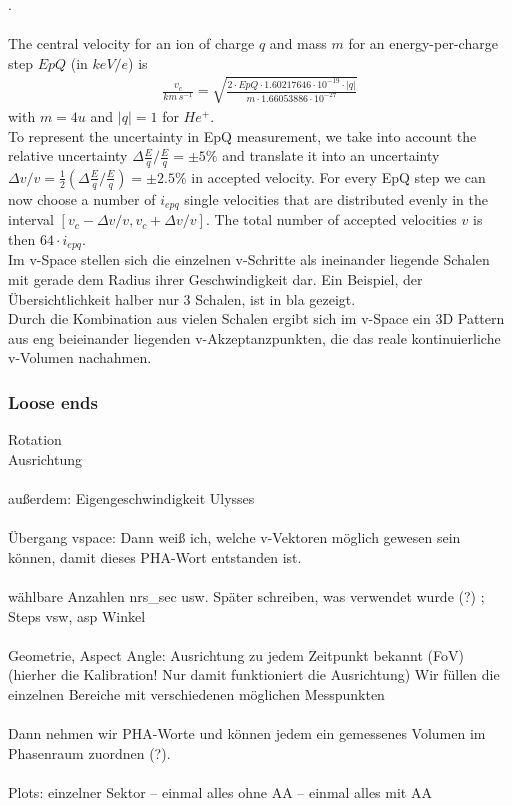 .
\\ \\
The central velocity for an ion of charge $q$ and mass $m$ for an energy-per-charge step $EpQ$ (in $keV/e$) is
\begin{align*}
\frac{v_c}{km \, s^{-1}} = \sqrt{\frac{2 \cdot EpQ \cdot 1.60217646\cdot10^{-19}\cdot |q|}{m \cdot 1.66053886 \cdot 10^{-27}} }
\end{align*}
with $m = 4 u$ and $|q| = 1$ for $He^{+}$.\\
To represent the uncertainty in EpQ measurement, we take into account the relative uncertainty $\Delta \frac{E}{q}/\frac{E}{q} = \pm 5\%$ and translate it into an uncertainty $\Delta v / v = \frac{1}{2} \left( \Delta \frac{E}{q}/\frac{E}{q}\right) = \pm 2.5\%$ in accepted velocity. For every EpQ step we can now choose a number of $i_{epq}$ single velocities that are distributed evenly in the interval $\left[ v_c - \Delta v / v, v_c + \Delta v / v \right]$. The total number of accepted velocities $v$ is then $64 \cdot i_{epq}$.
\\
Im v-Space stellen sich die einzelnen v-Schritte als ineinander liegende Schalen mit gerade dem Radius ihrer Geschwindigkeit dar. Ein Beispiel, der Übersichtlichkeit halber nur 3 Schalen, ist in bla gezeigt.
\\
Durch die Kombination aus vielen Schalen ergibt sich im v-Space ein 3D Pattern aus eng beieinander liegenden v-Akzeptanzpunkten, die das reale kontinuierliche v-Volumen nachahmen.

\subsubsection{Loose ends}
Rotation
\\ 
Ausrichtung
\\ \\
außerdem: Eigengeschwindigkeit Ulysses
\\ \\
Übergang vspace: Dann weiß ich, welche v-Vektoren möglich gewesen sein können, damit dieses PHA-Wort entstanden ist.
\\ \\
wählbare Anzahlen nrs\_sec usw. Später schreiben, was verwendet wurde (?) ; Steps vsw, asp Winkel
\\ \\
Geometrie, Aspect Angle: Ausrichtung zu jedem Zeitpunkt bekannt
(FoV) (hierher die Kalibration! Nur damit funktioniert die Ausrichtung)
Wir füllen die einzelnen Bereiche mit verschiedenen möglichen Messpunkten\\ \\
Dann nehmen wir PHA-Worte und können jedem ein gemessenes Volumen im Phasenraum zuordnen (?).
\\ \\
Plots: einzelner Sektor -- einmal alles ohne AA -- einmal alles mit AA

